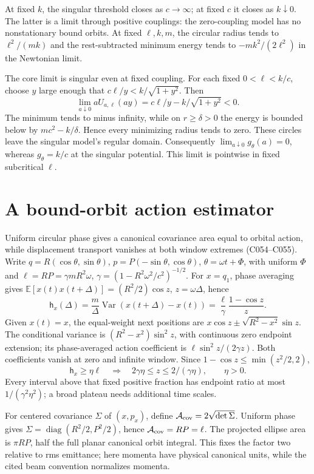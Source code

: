 \documentclass[11pt,a4paper]{article}
\begin{document}
At fixed $k$, the singular threshold closes as $c\to\infty$; at fixed $c$
it closes as $k\downarrow0$. The latter is a limit through positive couplings:
the zero-coupling model has no nonstationary bound orbits. At fixed $\ell,k,m$, the circular
radius tends to $\ell^2/(mk)$ and the rest-subtracted minimum energy tends to
$-mk^2/(2\ell^2)$ in the Newtonian limit.

The core limit is singular even at fixed coupling. For each fixed
$0<\ell<k/c$, choose $y$ large enough that
$c\ell/y<k/\sqrt{1+y^2}$. Then
\[
 \lim_{a\downarrow0}aU_{a,\ell}(ay)
 =c\ell/y-k/\sqrt{1+y^2}<0.
\]
The minimum tends to minus infinity, while on $r\ge\delta>0$ the energy is
bounded below by $mc^2-k/\delta$. Hence every minimizing radius tends to zero.
These circles leave the singular model's regular domain. Consequently
$\lim_{a\downarrow0}g_\theta(a)=0$, whereas $g_\theta=k/c$ at the singular
potential. This limit is pointwise in fixed subcritical $\ell$.

\section{A bound-orbit action estimator}
Uniform circular phase gives a canonical covariance area equal to orbital
action, while displacement transport vanishes at both window extremes
(C054--C055). Write $q=R(\cos\theta,\sin\theta)$,
$p=P(-\sin\theta,\cos\theta)$, $\theta=\omega t+\Phi$, with uniform
$\Phi$ and $\ell=RP=\gamma mR^2\omega$,
$\gamma=(1-R^2\omega^2/c^2)^{-1/2}$.
For $x=q_1$, phase averaging gives
$\mathbb E[x(t)x(t+\Delta)]=(R^2/2)\cos z$, $z=\omega\Delta$, hence
\[
 \mathsf h_x(\Delta)=\frac m\Delta\operatorname{Var}(x(t+\Delta)-x(t))
 =\frac{\ell}{\gamma}\frac{1-\cos z}{z}.
\]
Given $x(t)=x$, the equal-weight next positions are
$x\cos z\pm\sqrt{R^2-x^2}\sin z$. The conditional variance is
$(R^2-x^2)\sin^2z$, with continuous zero endpoint extension; its
phase-averaged action coefficient is $\ell\sin^2z/(2\gamma z)$.
Both coefficients vanish at zero and infinite window. Since
$1-\cos z\le\min(z^2/2,2)$,
\[
 \mathsf h_x\ge\eta\ell\quad\Longrightarrow\quad
 2\gamma\eta\le z\le2/(\gamma\eta),\qquad\eta>0.
\]
Every interval above that fixed positive fraction has endpoint ratio at most
$1/(\gamma^2\eta^2)$; a broad plateau needs additional time scales.

For centered covariance $\Sigma$ of $(x,p_x)$, define
$\mathcal A_{\rm cov}=2\sqrt{\det\Sigma}$. Uniform phase gives
$\Sigma=\operatorname{diag}(R^2/2,P^2/2)$, hence
$\mathcal A_{\rm cov}=RP=\ell$. The projected ellipse area is $\pi RP$,
half the full planar canonical orbit integral. This fixes the factor two
relative to rms emittance\cite{Groening2018Busch}; here momenta have physical
canonical units, while the cited beam convention normalizes momenta.
\end{document}
